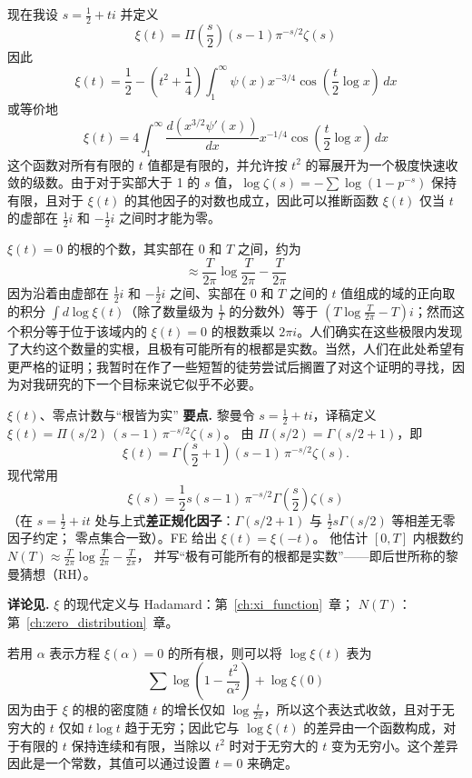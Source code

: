现在我设 $s = \frac{1}{2} + ti$ 并定义
\[
\xi(t) = \Pi\left(\frac{s}{2}\right) \left(s-1\right) \pi^{-s/2} \zeta(s)
\]
因此
\[
\xi(t) = \frac{1}{2} - \left(t^2 + \frac{1}{4}\right) \int_1^{\infty} \psi(x) x^{-3/4} \cos\left(\frac{t}{2} \log x\right) \, dx
\]
或等价地
\[
\xi(t) = 4 \int_1^{\infty} \frac{d\left(x^{3/2} \psi'(x)\right)}{dx} x^{-1/4} \cos\left(\frac{t}{2} \log x\right) \, dx
\]
这个函数对所有有限的 $t$ 值都是有限的，并允许按 $t^2$ 的幂展开为一个极度快速收敛的级数。由于对于实部大于 1 的 $s$ 值，$\log \zeta(s) = -\sum \log(1 - p^{-s})$ 保持有限，且对于 $\xi(t)$ 的其他因子的对数也成立，因此可以推断函数 $\xi(t)$ 仅当 $t$ 的虚部在 $\frac{1}{2}i$ 和 $-\frac{1}{2}i$ 之间时才能为零。

$\xi(t) = 0$ 的根的个数，其实部在 0 和 $T$ 之间，约为
\[
\approx \frac{T}{2\pi} \log\frac{T}{2\pi} - \frac{T}{2\pi}
\]
因为沿着由虚部在 $\frac{1}{2}i$ 和 $-\frac{1}{2}i$ 之间、实部在 0 和 $T$ 之间的 $t$ 值组成的域的正向取的积分 $\int d\log \xi(t)$（除了数量级为 $\frac{1}{T}$ 的分数外）等于 $\left(T \log\frac{T}{2\pi} - T\right) i$；然而这个积分等于位于该域内的 $\xi(t) = 0$ 的根数乘以 $2\pi i$。人们确实在这些极限内发现了大约这个数量的实根，且极有可能所有的根都是实数。当然，人们在此处希望有更严格的证明；我暂时在作了一些短暂的徒劳尝试后搁置了对这个证明的寻找，因为对我研究的下一个目标来说它似乎不必要。

\begin{commentary}{$\xi(t)$、零点计数与“根皆为实”}
\textbf{要点.}
黎曼令 $s=\frac12+ti$，译稿定义 $\xi(t)=\Pi(s/2)\,(s-1)\,\pi^{-s/2}\zeta(s)$。
由 $\Pi(s/2)=\Gamma(s/2+1)$，即
\[
\xi(t)=\Gamma\!\left(\frac{s}{2}+1\right)(s-1)\,\pi^{-s/2}\zeta(s).
\]
现代常用
\[
\xi(s)=\frac12 s(s-1)\,\pi^{-s/2}\Gamma\!\left(\frac{s}{2}\right)\zeta(s)
\]
（在 $s=\frac12+it$ 处与上式\textbf{差正规化因子}：$\Gamma(s/2+1)$ 与 $\frac12 s\Gamma(s/2)$ 等相差无零因子约定；
零点集合一致）。FE 给出 $\xi(t)=\xi(-t)$。
他估计 $[0,T]$ 内根数约 $N(T)\approx\frac{T}{2\pi}\log\frac{T}{2\pi}-\frac{T}{2\pi}$，
并写“极有可能所有的根都是实数”——即后世所称的黎曼猜想（RH）。

\textbf{详论见.}
$\xi$ 的现代定义与 Hadamard：第~\ref{ch:xi_function}~章；
$N(T)$：第~\ref{ch:zero_distribution}~章。
\end{commentary}

若用 $\alpha$ 表示方程 $\xi(\alpha) = 0$ 的所有根，则可以将 $\log \xi(t)$ 表为
\[
\sum \log\left(1 - \frac{t^2}{\alpha^2}\right) + \log \xi(0)
\]
因为由于 $\xi$ 的根的密度随 $t$ 的增长仅如 $\log\frac{t}{2\pi}$，所以这个表达式收敛，且对于无穷大的 $t$ 仅如 $t \log t$ 趋于无穷；因此它与 $\log \xi(t)$ 的差异由一个函数构成，对于有限的 $t$ 保持连续和有限，当除以 $t^2$ 时对于无穷大的 $t$ 变为无穷小。这个差异因此是一个常数，其值可以通过设置 $t = 0$ 来确定。

